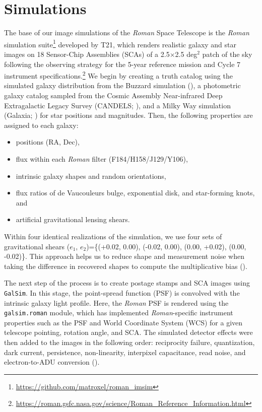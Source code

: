 \documentclass[fleqn,usenatbib]{mnras}
\begin{document}
\section{Simulations}
\label{sec:sims}
The base of our image simulations of the \emph{Roman} Space Telescope is the \emph{Roman} simulation suite\footnote{\url{ https://github.com/matroxel/roman_imsim}} developed by T21, which renders realistic galaxy and star images on 18 Sensor-Chip Assemblies (SCAs) of a 2.5$\times$2.5 \textrm{deg}$^{2}$ patch of the sky following the observing strategy for the 5-year reference mission and Cycle 7 instrument specifications.\footnote{\url{https://roman.gsfc.nasa.gov/science/Roman_Reference_Information.html}} We begin by creating a truth catalog using the simulated galaxy distribution from the Buzzard simulation (\citealt{2019arXiv190102401D}), a photometric galaxy catalog sampled from the Cosmic Assembly Near-infrared Deep Extragalactic Legacy Survey (CANDELS; \citealt{2011ApJS..197...35G, 2011ApJS..197...36K, 2019ApJ...877..117H}), and a Milky Way simulation (Galaxia; \citealt{2011ApJ...730....3S}) for star positions and magnitudes. Then, the following properties are assigned to each galaxy:
\begin{itemize}
    \item positions (RA, Dec),
    \item flux within each \emph{Roman} filter (F184/H158/J129/Y106),
    \item intrinsic galaxy shapes and random orientations,
    \item flux ratios of de Vaucouleurs bulge, exponential disk, and star-forming knots, and
    \item artificial gravitational lensing shears.
\end{itemize} 
Within four identical realizations of the simulation, we use four sets of gravitational shears ($e_{1}$, $e_{2}$)=\{(+0.02, 0.00), (-0.02, 0.00), (0.00, +0.02), (0.00, -0.02)\}. This approach helps us to reduce shape and measurement noise when taking the difference in recovered shapes to compute the multiplicative bias (\citealt{2019A&A...621A...2P}). 


The next step of the process is to create postage stamps and SCA images using \texttt{GalSim}. In this stage, the point-spread function (PSF) is convolved with the intrinsic galaxy light profile. Here, the \emph{Roman} PSF is rendered using the \texttt{galsim.roman} module, which has implemented \emph{Roman}-specific instrument properties such as the PSF and World Coordinate System (WCS) for a given telescope pointing, rotation angle, and SCA. The simulated detector effects were then added to the images in the following order: reciprocity failure, quantization, dark current, persistence, non-linearity, interpixel capacitance, read noise, and electron-to-ADU conversion (\citealt{2020JATIS...6d6001M}).
\end{document}
